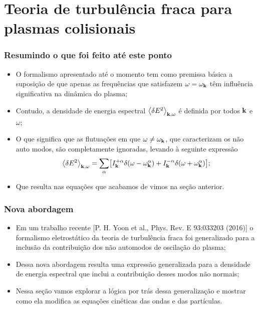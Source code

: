 \documentclass[10pt,aspectratio=1610,lualatex]{beamer}
\begin{document}
\section{Teoria de turbulência fraca para plasmas colisionais}
\begin{frame}
  \frametitle{Resumindo o que foi feito até este ponto}
  \begin{itemize}
    \item O formalismo apresentado até o momento tem como premissa
    básica a suposição de que apenas as frequências que satisfazem
    $\omega=\omega_{\bf k}$ têm influência significativa na dinâmica
    do plasma;
    \vspace{0.5cm}
    \pause
    \item Contudo, a densidade de energia espectral
    $\left<\delta E^2\right>_{{\bf k},\omega}$ é definida por todos
    ${\bf k}$ e $\omega$;
    \vspace{0.55cm}
    \pause
    \item O que significa que as flutuações em que
    $\omega \ne \omega_{\bf k}$, que caracterizam os não auto modos,
    são completamente ignoradas, levando à seguinte expressão
    \begin{equation*}
      \left<\delta E^2\right>_{{\bf k},\omega}
      =\sum_{\alpha}\bigl[I^{+\alpha}_{\bf k}
      \delta(\omega-\omega_{\bf k}^{\alpha})
      +I^{-\alpha}_{\bf k} \delta(\omega+\omega_{\bf k}^{\alpha})\bigr];
    \end{equation*}
    \pause
    \item Que resulta nas equações que acabamos de vimos na seção
    anterior.
  \end{itemize}
\end{frame}

\begin{frame}
  \frametitle{Nova abordagem}
  \begin{itemize}
    \item Em um trabalho recente [P. H. Yoon et al., Phys. Rev.
    E 93:033203 (2016)] o formalismo eletrostático da teoria
    de turbulência fraca foi generalizado para a inclusão da
    contribuição dos não automodos de oscilação do plasma;
    \vspace{0.5cm}
    \pause
    \item Dessa nova abordagem resulta uma expressão generalizada
    para a densidade de energia espectral que inclui a contribuição
    desses modos não normais;
    \vspace{0.5cm}
    \pause
    \item Nessa seção vamos explorar a lógica por trás dessa
    generalização e mostrar como ela modifica as equações
    cinéticas das ondas e das partículas.
  \end{itemize}
\end{frame}
\end{document}
